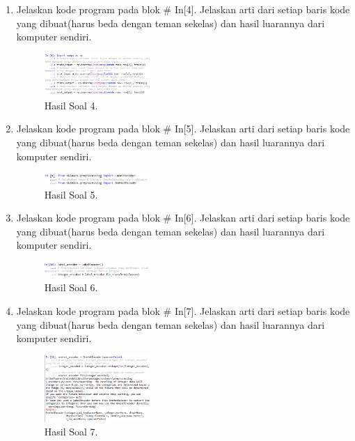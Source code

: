 \begin{enumerate}
	\item Jelaskan kode program pada blok \# In[4]. Jelaskan arti dari setiap baris kode yang dibuat(harus beda dengan teman sekelas) dan hasil luarannya dari komputer sendiri.
	\hfill\break
	
	\begin{figure}[H]
	\centering
		\includegraphics[width=4cm]{figures/1174096/tugas7/praktek_4.PNG}
		\caption{Hasil Soal 4.}
	\end{figure}

	\item Jelaskan kode program pada blok \# In[5]. Jelaskan arti dari setiap baris kode yang dibuat(harus beda dengan teman sekelas) dan hasil luarannya dari komputer sendiri.
	\hfill\break
	
	\begin{figure}[H]
	\centering
		\includegraphics[width=4cm]{figures/1174096/tugas7/praktek_5.PNG}
		\caption{Hasil Soal 5.}
	\end{figure}

	\item Jelaskan kode program pada blok \# In[6]. Jelaskan arti dari setiap baris kode yang dibuat(harus beda dengan teman sekelas) dan hasil luarannya dari komputer sendiri.
	\hfill\break
	
	\begin{figure}[H]
	\centering
		\includegraphics[width=4cm]{figures/1174096/tugas7/praktek_6.PNG}
		\caption{Hasil Soal 6.}
	\end{figure}

	\item Jelaskan kode program pada blok \# In[7]. Jelaskan arti dari setiap baris kode yang dibuat(harus beda dengan teman sekelas) dan hasil luarannya dari komputer sendiri.
	\hfill\break
	
	\begin{figure}[H]
	\centering
		\includegraphics[width=4cm]{figures/1174096/tugas7/praktek_7.PNG}
		\caption{Hasil Soal 7.}
	\end{figure}


\end{enumerate}
